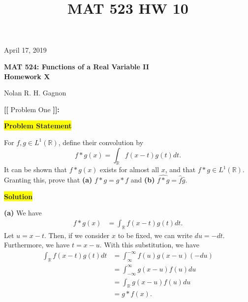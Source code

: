 \documentclass[12pt]{article}
\title{MAT 523 HW 10}
\newcommand{\mybox}{%
    \collectbox{%
        \setlength{\fboxsep}{2pt}%
        \fbox{\BOXCONTENT}%
    }%
}
\begin{document}
\hfill April 17, 2019
\begin{center}
\begin{large}
\textbf{MAT 524: Functions of a Real Variable II \\
\vspace{-5mm}
Homework X \\}
\end{large}
\vspace{-2mm}
Nolan R. H. Gagnon \\
\end{center}
\vspace{-0.5cm}
\noindent \textbf{{\huge [}{\Large [}} Problem One \textbf{{\Large ]}{\huge ]}}{\Large \textbf{:}}

\vspace{3mm}

\noindent\mybox{\colorbox{yellow}{\textbf{Problem Statement}}}\hspace{3mm}\hrulefill

\noindent For $f,g\in L^{1}(\mathbb{R})$, define their convolution by $$f * g(x) = \int_{\mathbb{R}} f(x-t)g(t) dt.$$ It can be shown that $f*g(x)$ exists for almost all $x$, and that $f*g\in L^{1}(\mathbb{R})$. Granting this, prove that \textbf{(a)} $f*g = g*f$ and \textbf{(b)} $\widehat{f *g} = \hat{f}\hat{g}.$

\noindent\mybox{\colorbox{yellow}{\textbf{Solution}}}\hspace{3mm}\hrulefill

\noindent \textbf{(a)} We have
\begin{align}
    f * g(x) &= \int_\mathbb{R} f(x-t)g(t)dt. \label{eq1.1}
\end{align}
Let $u=x-t$. Then, if we consider $x$ to be fixed, we can write $du = -dt$. Furthermore, we have $t=x-u$. With this substitution, we have
\begin{align}
    \int_\mathbb{R} f(x-t)g(t)dt &= \int_{\infty}^{-\infty} f(u)g(x-u)(-du) \\
    &=\int_{-\infty}^{\infty}g(x-u)f(u)du \\
    &=\int_\mathbb{R}g(x-u)f(u)du \\
    &= g * f(x).
\end{align}

\vspace{5mm}
\end{document}
